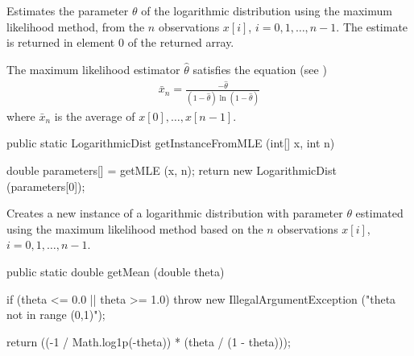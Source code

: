\begin{tabb}
   Estimates the parameter $\theta$ of the logarithmic distribution
   using the maximum likelihood method, from the $n$ observations 
   $x[i]$, $i = 0, 1, \ldots, n-1$. The estimate is returned in element 0
   of the returned array. 
   \begin{detailed}
   The maximum likelihood estimator $\hat{\theta}$ satisfies the equation
   (see \cite[page 122]{mEVA00a})
   \begin{eqnarray*}
      \bar{x}_n = \frac{-\hat{\theta}}{(1 - \hat{\theta}) \ln(1 - \hat{\theta})}
   \end{eqnarray*}
   where  $\bar{x}_n$ is the average of $x[0], \ldots, x[n-1]$.
   \end{detailed}
\end{tabb}
\begin{htmlonly}
\end{htmlonly}
\begin{code}

   public static LogarithmicDist getInstanceFromMLE (int[] x, int n)\begin{hide} {
      double parameters[] = getMLE (x, n);
      return new LogarithmicDist (parameters[0]);
   }\end{hide}
\end{code}
\begin{tabb}
   Creates a new instance of a logarithmic distribution with parameter
   $\theta$ estimated using the maximum likelihood method based on the $n$
   observations $x[i]$, $i = 0, 1, \ldots, n-1$.
\end{tabb}
\begin{htmlonly}
\end{htmlonly}
\begin{code}

   public static double getMean (double theta)\begin{hide} {
      if (theta <= 0.0 || theta >= 1.0)
         throw new IllegalArgumentException ("theta not in range (0,1)");

      return ((-1 / Math.log1p(-theta)) * (theta / (1 - theta)));
   }\end{hide}
\end{code}
